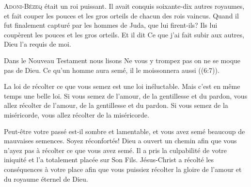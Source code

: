\dvrule







\lettrine{A}{doni-Bézeq} était un roi puissant.
 Il avait conquis soixante-dix autres royaumes, et fait couper les pouces
 et les gros orteils de chacun des rois vaincus.
 Quand il fut finalement capturé par les hommes de Juda, que lui firent-ils?
 Ils lui coupèrent les pouces et les gros orteils.
 Et il dit\frcolon{} \Og Ce que j'ai fait subir aux autres, Dieu l'a requis de moi. \Fg{}

Dans le Nouveau Testament nous lisons\frcolon{}
 \Og Ne vous y trompez pas\frcolon{} on ne se moque pas de Dieu.
 Ce qu'un homme aura semé, il le moissonnera aussi \Fg{} ((6:7)).


La loi de récolter ce que vous semez est une loi inéluctable.
 Mais c'est en même temps une belle loi.
 Si vous semez de l'amour, de la gentillesse et du pardon,
 vous allez récolter de l'amour, de la gentillesse et du pardon.
 Si vous semez de la miséricorde, vous allez récolter de la miséricorde.

Peut-être votre passé est-il sombre et lamentable,
 et vous avez semé beaucoup de mauvaises semences.
 Soyez réconfortés!
 Dieu a ouvert un chemin afin que vous n'ayez pas à récolter
 ce que vous avez semé.
 Il a pris la culpabilité de votre iniquité et l'a totalement placée
 sur Son Fils.
 Jésus-Christ a récolté les conséquences à votre place
 \ocadr afin que vous puissiez récolter la gloire de l'amour
 et du royaume éternel de Dieu. 

